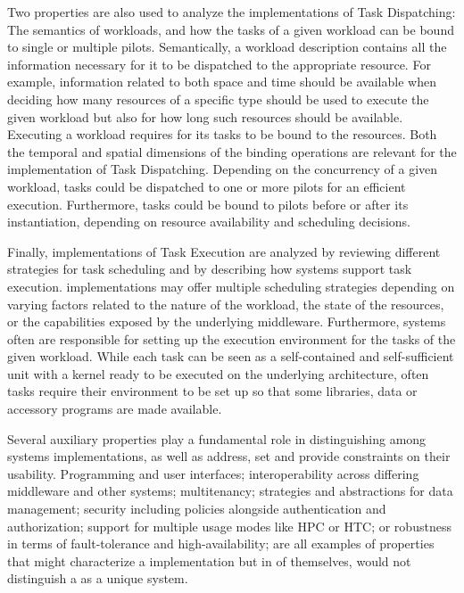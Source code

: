 \documentclass{sig-alternate}
\begin{document}
Two properties are also used to analyze the implementations of Task
Dispatching: The semantics of workloads, and how the tasks of a given workload
can be bound to single or multiple pilots. Semantically, a workload description
contains all the information necessary for it to be dispatched to the
appropriate resource. For example, information related to both space and time
should be available when deciding how many resources of a specific type should
be used to execute the given workload but also for how long such resources
should be available. Executing a workload requires for its tasks to be bound to
the resources. Both the temporal and spatial dimensions of the binding
operations are relevant for the implementation of Task Dispatching. Depending
on the concurrency of a given workload, tasks could be dispatched to one or
more pilots for an efficient execution. Furthermore, tasks could be bound to
pilots before or after its instantiation, depending on resource availability
and scheduling decisions.


Finally, implementations of Task Execution are analyzed by reviewing different
strategies for task scheduling and by describing how \pilotjob systems support
task execution. \pilotjob implementations may offer multiple scheduling
strategies depending on varying factors related to the nature of the workload,
the state of the resources, or the capabilities exposed by the underlying
middleware. Furthermore, \pilotjob systems often are responsible for setting up
the execution environment for the tasks of the given workload. While each task
can be seen as a self-contained and self-sufficient unit with a kernel ready to
be executed on the underlying architecture, often tasks require their
environment to be set up so that some libraries, data or accessory programs
are made available.

Several auxiliary properties play a fundamental role in distinguishing
among \pilotjob systems implementations, as well as address, set and
provide constraints on their usability.  Programming and user
interfaces; interoperability across differing middleware and other
\pilotjob systems; multitenancy; strategies and abstractions for data
management; security including policies alongside authentication and
authorization; support for multiple usage modes like HPC or HTC; or
robustness in terms of fault-tolerance and high-availability; are all
examples of properties that might characterize a \pilotjob
implementation but in of themselves, would not distinguish a \pilotjob
as a unique system.
\end{document}
